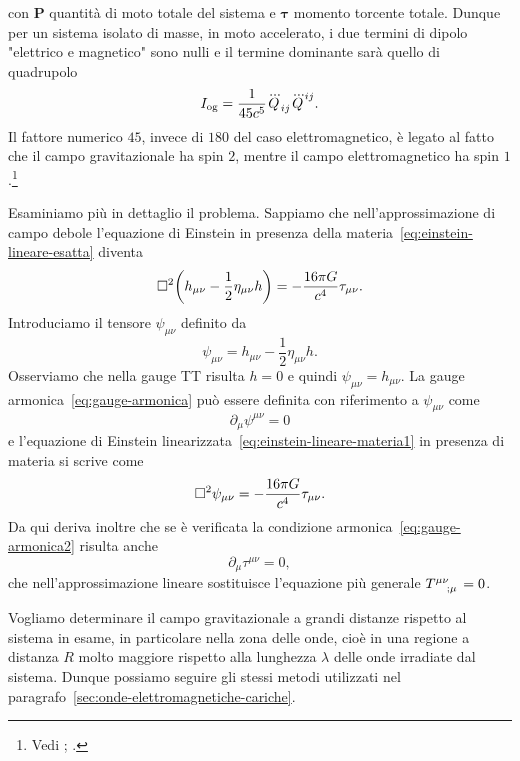 con $\bm{P}$ quantità di moto totale del sistema e $\bm{\tau}$ momento torcente
totale.  Dunque per un sistema isolato di masse, in moto accelerato, i due
termini di dipolo "elettrico e magnetico" sono nulli e il termine dominante sarà
quello di quadrupolo
\begin{equation}
  I_{\textup{og}} = \frac{1}{45c^{5}}\dddot{Q}_{ij}\dddot{Q}^{ij}.
\end{equation}
Il fattore numerico $45$, invece di $180$ del caso elettromagnetico, è legato al
fatto che il campo gravitazionale ha spin $2$, mentre il campo elettromagnetico
ha spin $1$.\footnote{Vedi \textcite[974]{misner:gravitation};
  \textcite[471]{shapiro:black-holes}.}

Esaminiamo più in dettaglio il problema.  Sappiamo che nell'approssimazione di
campo debole l'equazione di Einstein in presenza della
materia~\eqref{eq:einstein-lineare-esatta} diventa
\begin{equation}
  \label{eq:einstein-lineare-materia1}
  \Box^{2} \bigg(h_{\mu\nu} - \frac{1}{2} \eta_{\mu\nu}h \bigg) = -\frac{16\pi
    G}{c^{4}} \tau_{\mu\nu}.
\end{equation}
Introduciamo il tensore $\psi_{\mu\nu}$ definito da
\begin{equation}
  \psi_{\mu\nu} = h_{\mu\nu} - \frac{1}{2} \eta_{\mu\nu} h.
\end{equation}
Osserviamo che nella gauge TT risulta $h = 0$ e quindi
$\psi_{\mu\nu} = h_{\mu\nu}$.  La gauge armonica~\eqref{eq:gauge-armonica} può
essere definita con riferimento a $\psi_{\mu\nu}$ come
\begin{equation}
  \label{eq:gauge-armonica2}
  \partial_{\mu}\psi^{\mu\nu} = 0
\end{equation}
e l'equazione di Einstein linearizzata~\eqref{eq:einstein-lineare-materia1} in
presenza di materia si scrive come
\begin{equation}
  \label{eq:einstein-lineare-materia2}
  \Box^{2} \psi_{\mu\nu} = -\frac{16\pi G}{c^{4}} \tau_{\mu\nu}.
\end{equation}
Da qui deriva inoltre che se è verificata la condizione
armonica~\eqref{eq:gauge-armonica2} risulta anche
\begin{equation}
  \label{eq:gauge-armonica-tau}
  \partial_{\mu}\tau^{\mu\nu} = 0,
\end{equation}
che nell'approssimazione lineare sostituisce l'equazione più generale
$\tensor{T}{^{\mu\nu}_{;\mu}} = 0$.

Vogliamo determinare il campo gravitazionale a grandi distanze rispetto al
sistema in esame, in particolare nella zona delle onde,
cioè in una regione a distanza $R$ molto maggiore rispetto alla lunghezza
$\lambda$ delle onde irradiate dal sistema.  Dunque possiamo seguire gli stessi
metodi utilizzati nel paragrafo~\ref{sec:onde-elettromagnetiche-cariche}.

